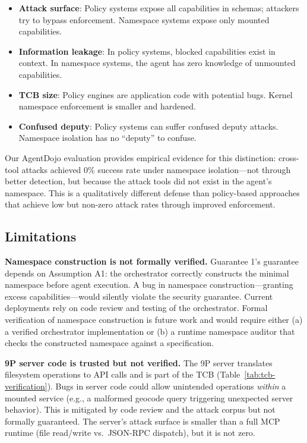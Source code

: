\documentclass{article}
\begin{document}
\begin{itemize}
    \item \textbf{Attack surface}: Policy systems expose all capabilities in schemas; attackers try to bypass enforcement. Namespace systems expose only mounted capabilities.
    \item \textbf{Information leakage}: In policy systems, blocked capabilities exist in context. In namespace systems, the agent has zero knowledge of unmounted capabilities.
    \item \textbf{TCB size}: Policy engines are application code with potential bugs. Kernel namespace enforcement is smaller and hardened.
    \item \textbf{Confused deputy}: Policy systems can suffer confused deputy attacks. Namespace isolation has no ``deputy'' to confuse.
\end{itemize}

Our AgentDojo evaluation provides empirical evidence for this distinction: cross-tool attacks achieved 0\% success rate under namespace isolation---not through better detection, but because the attack tools did not exist in the agent's namespace. This is a qualitatively different defense than policy-based approaches that achieve low but non-zero attack rates through improved enforcement.

\subsection{Limitations}

\textbf{Namespace construction is not formally verified.} Guarantee 1's guarantee depends on Assumption A1: the orchestrator correctly constructs the minimal namespace before agent execution. A bug in namespace construction---granting excess capabilities---would silently violate the security guarantee. Current deployments rely on code review and testing of the orchestrator. Formal verification of namespace construction is future work and would require either (a) a verified orchestrator implementation or (b) a runtime namespace auditor that checks the constructed namespace against a specification.

\textbf{9P server code is trusted but not verified.} The 9P server translates filesystem operations to API calls and is part of the TCB (Table~\ref{tab:tcb-verification}). Bugs in server code could allow unintended operations \textit{within} a mounted service (e.g., a malformed geocode query triggering unexpected server behavior). This is mitigated by code review and the attack corpus but not formally guaranteed. The server's attack surface is smaller than a full MCP runtime (file read/write vs.\ JSON-RPC dispatch), but it is not zero.
\end{document}
